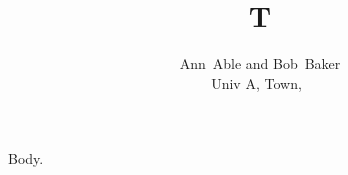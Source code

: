 \documentclass[journal]{IEEEtran}
\begin{document}
\title{T}
\author{Ann~Able and Bob~Baker\\
Univ A, Town,~}
\maketitle
Body.
\end{document}
